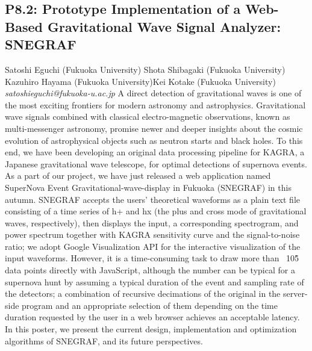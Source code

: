 \documentclass{report}
\begin{document}
\subsection*{P8.2: Prototype Implementation of a Web-Based Gravitational Wave Signal Analyzer: SNEGRAF}
\bigskip
Satoshi Eguchi (Fukuoka University) \newline Shota Shibagaki (Fukuoka University) \newline  Kazuhiro Hayama (Fukuoka University)\newline  Kei Kotake (Fukuoka University)\newline  \newline  \newline\newline
{\it satoshieguchi@fukuoka-u.ac.jp}\newline
\newline\newline
A direct detection of gravitational waves is one of the most exciting frontiers for modern astronomy and astrophysics. Gravitational wave signals combined with classical electro-magnetic observations, known as multi-messenger astronomy, promise newer and deeper insights about the cosmic evolution of astrophysical objects such as neutron starts and black holes. To this end, we have been developing an original data processing pipeline for KAGRA, a Japanese gravitational wave telescope, for optimal detections of supernova events. As a part of our project, we have just released a web application named SuperNova Event Gravitational-wave-display in Fukuoka (SNEGRAF) in this autumn. SNEGRAF accepts the users' theoretical waveforms as a plain text file consisting of a time series of h+ and hx (the plus and cross mode of gravitational waves, respectively), then displays the input, a corresponding spectrogram, and power spectrum together with KAGRA sensitivity curve and the signal-to-noise ratio; we adopt Google Visualization API for the interactive visualization of the input waveforms. However, it is a time-consuming task to draw more than ~10\^5 data points directly with JavaScript, although the number can be typical for a supernova hunt by assuming a typical duration of the event and sampling rate of the detectors; a combination of recursive decimations of the original in the server-side program and an appropriate selection of them depending on the time duration requested by the user in a web browser achieves an acceptable latency. In this poster, we present the current design, implementation and optimization algorithms of SNEGRAF, and its future perspectives.\newline
\newpage
\end{document}
